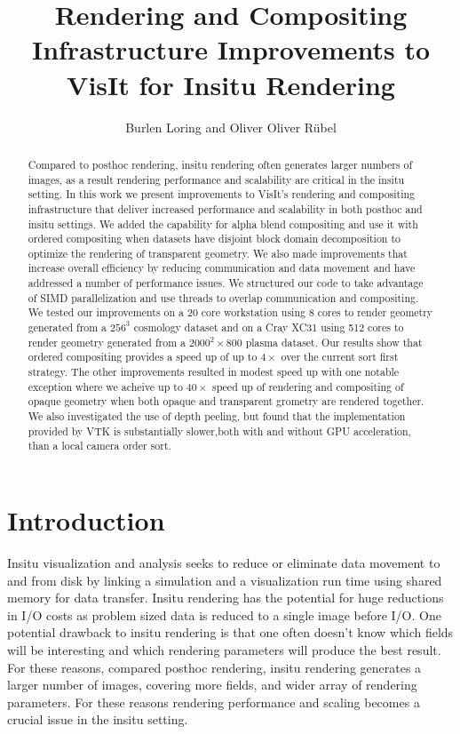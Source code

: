 \documentclass[a4paper,10pt]{report}
\title{Rendering and Compositing Infrastructure Improvements to VisIt for Insitu Rendering}
\author{Burlen Loring and Oliver Oliver R\"ubel}
\begin{document}
\maketitle

\begin{abstract}
Compared to posthoc rendering, insitu rendering often generates larger numbers of images, as a result rendering performance and scalability are critical in the insitu setting. In this work we present improvements to VisIt's rendering and compositing infrastructure that deliver increased performance and scalability in both posthoc and insitu settings. We added the capability for alpha blend compositing and use it with ordered compositing when datasets have disjoint block domain decomposition to optimize the rendering of transparent geometry. We also made improvements that increase overall efficiency by reducing communication and data movement and have addressed a number of performance issues. We structured our code to take advantage of SIMD parallelization and use threads to overlap communication and compositing. We tested our improvements on a 20 core workstation using 8 cores to render geometry generated from a $256^3$ cosmology dataset and on a Cray XC31 using 512 cores to render geometry generated from a $2000^2 \times 800$ plasma dataset. Our results show that ordered compositing provides a speed up of up to $4 \times$ over the current sort first strategy. The other improvements resulted in modest speed up with one notable exception where we acheive up to $40 \times$ speed up of rendering and compositing of opaque geometry when both opaque and transparent grometry are rendered together. We also investigated the use of depth peeling, but found that the implementation provided by VTK is substantially slower,both with and without GPU acceleration, than a local camera order sort.
\end{abstract}

\section{Introduction}
Insitu visualization and analysis seeks to reduce or eliminate data movement to and from disk by linking a simulation and a visualization run time using shared memory for data transfer. Insitu rendering has the potential for huge reductions in I/O costs as problem sized data is reduced to a single image before I/O. One potential drawback to insitu rendering is that one often doesn't know which fields will be interesting and which rendering parameters will produce the best result. For these reasons, compared posthoc rendering, insitu rendering generates a larger number of images, covering more fields, and wider array of rendering parameters. For these reasons rendering performance and scaling becomes a crucial issue in the insitu setting.
\end{document}
